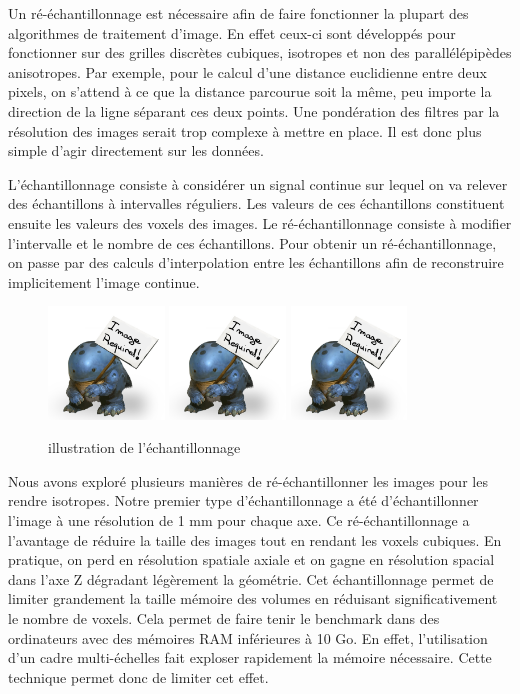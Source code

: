 Un ré-échantillonnage est nécessaire afin de faire fonctionner la plupart des algorithmes de traitement d'image. En effet ceux-ci sont développés pour fonctionner sur des grilles discrètes cubiques, isotropes et non des parallélépipèdes anisotropes. Par exemple, pour le calcul d'une distance euclidienne entre deux pixels, on s'attend à ce que la distance parcourue soit la même, peu importe la direction de la ligne séparant ces deux points. Une pondération des filtres par la résolution des images serait trop complexe à mettre en place. Il est donc plus simple d'agir directement sur les données.

L'échantillonnage consiste à considérer un signal continue sur lequel on va relever des échantillons à intervalles réguliers. Les valeurs de ces échantillons constituent ensuite les valeurs des voxels des images. Le ré-échantillonnage consiste à modifier l'intervalle et le nombre de ces échantillons. Pour obtenir un ré-échantillonnage, on passe par des calculs d'interpolation entre les échantillons afin de reconstruire implicitement l'image continue.

\begin{figure}
  \centering
  \includegraphics[height=3cm]{Images/img_required.jpg}
  \includegraphics[height=3cm]{Images/img_required.jpg}
  \includegraphics[height=3cm]{Images/img_required.jpg}
  \caption{illustration de l'échantillonnage}
\end{figure}

Nous avons exploré plusieurs manières de ré-échantillonner les images pour les rendre isotropes. Notre premier type d'échantillonnage a été d'échantillonner l'image à une résolution de 1 mm pour chaque axe. Ce ré-échantillonnage a l'avantage de réduire la taille des images tout en rendant les voxels cubiques. En pratique, on perd en résolution spatiale axiale et on gagne en résolution spacial dans l'axe Z dégradant légèrement la géométrie. Cet échantillonnage permet de limiter grandement la taille mémoire des volumes en réduisant significativement le nombre de voxels. Cela permet de faire tenir le benchmark dans des ordinateurs avec des mémoires RAM inférieures à 10 Go. En effet, l'utilisation d'un cadre multi-échelles fait exploser rapidement la mémoire nécessaire. Cette technique permet donc de limiter cet effet.

